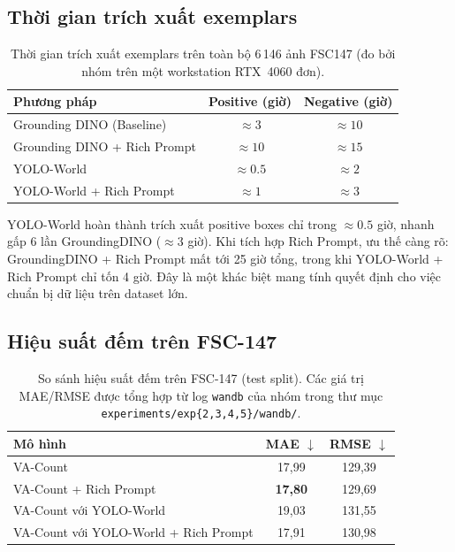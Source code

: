 \documentclass[a4paper,12pt]{report}
\numberwithin{figure}{chapter}
\numberwithin{table}{chapter}
\begin{document}
\subsection{Thời gian trích xuất exemplars}

\begin{table}[H]
\centering
\renewcommand{\arraystretch}{1.2}
\begin{tabular}{|l|c|c|}
\hline
\rowcolor[HTML]{EFEFEF}
\textbf{Phương pháp} & \textbf{Positive (giờ)} & \textbf{Negative (giờ)} \\
\hline
Grounding DINO (Baseline) & $\approx 3$ & $\approx 10$ \\
\hline
Grounding DINO + Rich Prompt & $\approx 10$ & $\approx 15$ \\
\hline
YOLO-World & $\approx 0.5$ & $\approx 2$ \\
\hline
YOLO-World + Rich Prompt & $\approx 1$ & $\approx 3$ \\
\hline
\end{tabular}
\caption{Thời gian trích xuất exemplars trên toàn bộ 6\,146 ảnh FSC147 (đo bởi nhóm trên một workstation RTX~4060 đơn).}
\label{tab:extract_time}
\end{table}

YOLO-World hoàn thành trích xuất positive boxes chỉ trong $\approx 0{.}5$ giờ, nhanh gấp 6 lần GroundingDINO ($\approx 3$ giờ). Khi tích hợp Rich Prompt, ưu thế càng rõ: GroundingDINO + Rich Prompt mất tới 25 giờ tổng, trong khi YOLO-World + Rich Prompt chỉ tốn 4 giờ. Đây là một khác biệt mang tính quyết định cho việc chuẩn bị dữ liệu trên dataset lớn.

\subsection{Hiệu suất đếm trên FSC-147}

\begin{table}[H]
\centering
\renewcommand{\arraystretch}{1.2}
\begin{tabular}{|l|c|c|}
\hline
\rowcolor[HTML]{EFEFEF}
\textbf{Mô hình} & \textbf{MAE} $\downarrow$ & \textbf{RMSE} $\downarrow$ \\
\hline
VA-Count & 17,99 & 129,39 \\
\hline
VA-Count + Rich Prompt & \textbf{17,80} & 129,69 \\
\hline
VA-Count với YOLO-World & 19,03 & 131,55 \\
\hline
VA-Count với YOLO-World + Rich Prompt & 17,91 & 130,98 \\
\hline
\end{tabular}
\caption{So sánh hiệu suất đếm trên FSC-147 (test split). Các giá trị MAE/RMSE được tổng hợp từ log \texttt{wandb} của nhóm trong thư mục \mbox{\texttt{experiments/exp\{2,3,4,5\}/wandb/}}.}
\label{tab:counting_perf}
\end{table}
\end{document}
